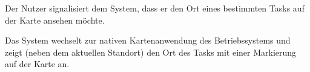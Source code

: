 	\label{showMap}
	\begin{description}
		\begin{verlauf}
		
			\item Der Nutzer signalisiert dem System, dass er den Ort eines bestimmten Tasks auf der Karte ansehen möchte.
			\item Das System wechselt zur nativen Kartenanwendung des Betriebssystems und zeigt (neben dem aktuellen Standort) den Ort des Tasks mit einer Markierung auf der Karte an.
		
		\end{verlauf}
	\end{description}
	